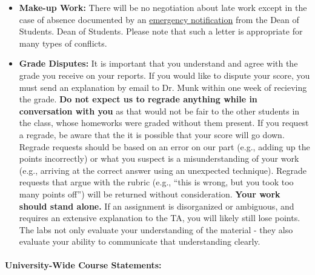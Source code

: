 \documentclass[11pt, a4paper]{article}
\begin{document}
\begin{itemize}
\item[] \textbf{Make-up Work:} There will be no negotiation about late work
        except in the case of absence documented by an 
\href{https://studentlife.oregonstate.edu/emergency-notifications}{emergency notification} from the Dean of Students.
        Dean of Students. Please note that such a letter is appropriate for many
        types of conflicts. 

\item[] \textbf{Grade Disputes:} It is important that you understand and agree
        with the grade you receive on your reports. If you would like
        to dispute your score, you must send an explanation by email to Dr.
        Munk within one week of recieving the grade.
        \textbf{Do not expect us to regrade anything while in conversation with
        you} as that would not be fair to the other students in the class, whose
        homeworks were graded without them present.  If you request a regrade,
        be aware that the it is possible that your score will go down.
        Regrade requests should be based on an error on our part (e.g., adding
        up the points incorrectly) or what you suspect is a misunderstanding of
        your work (e.g., arriving at the correct answer using an unexpected
        technique). Regrade requests that argue with the rubric (e.g., ``this is
        wrong, but you took too many points off'') will be returned without
        consideration.
        \textbf{Your work should stand alone.} If an assignment is disorganized or
        ambiguous, and requires an extensive explanation to the TA, you
        will likely still lose points. The labs not only evaluate your
        understanding of the material - they also evaluate your ability to
        communicate that understanding clearly.
\end{itemize}

\paragraph{University-Wide Course Statements:}
\end{document}
